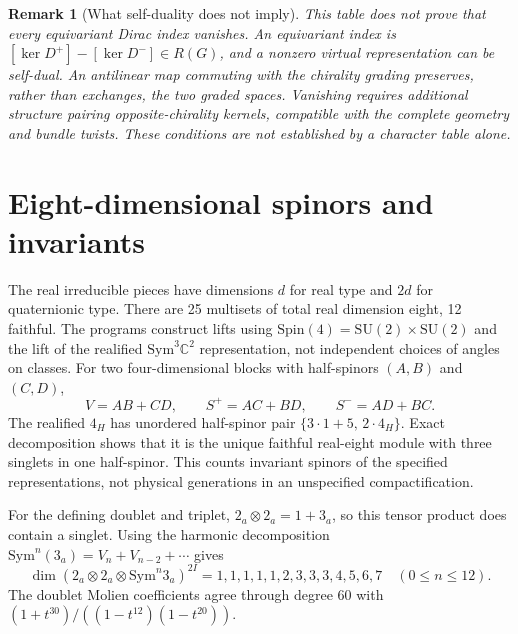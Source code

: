 \documentclass[11pt,a4paper]{amsart}
\newtheorem{remark}[proposition]{Remark}
\newcommand{\C}{\mathbb C}
\newcommand{\SU}{\mathrm{SU}}
\newcommand{\Spin}{\mathrm{Spin}}
\newcommand{\Sym}{\mathrm{Sym}}
\begin{document}
\begin{remark}[What self-duality does not imply]
This table does not prove that every equivariant Dirac index vanishes.
An equivariant index is $[\ker D^+]-[\ker D^-]\in R(G)$, and a nonzero
virtual representation can be self-dual. An antilinear map commuting with
the chirality grading preserves, rather than exchanges, the two graded
spaces. Vanishing requires additional structure pairing opposite-chirality
kernels, compatible with the complete geometry and bundle twists. These
conditions are not established by a character table alone.
\end{remark}

\section{Eight-dimensional spinors and invariants}
The real irreducible pieces have dimensions $d$ for real type and $2d$
for quaternionic type. There are 25 multisets of total real dimension eight,
12 faithful. The programs construct lifts using
$\Spin(4)=\SU(2)\times\SU(2)$ and the lift of the realified
$\Sym^3\C^2$ representation, not independent choices of angles on classes.
For two four-dimensional blocks with half-spinors $(A,B)$ and $(C,D)$,
\[
 V=AB+CD,\qquad S^+=AC+BD,\qquad S^-=AD+BC.
\]
The realified $4_H$ has unordered half-spinor pair
$\{3\cdot1+5,\,2\cdot4_H\}$. Exact decomposition shows that it is the
unique faithful real-eight module with three singlets in one half-spinor.
This counts invariant spinors of the specified representations, not
physical generations in an unspecified compactification.

For the defining doublet and triplet,
$2_a\otimes2_a=1+3_a$, so this tensor product does contain a singlet.
Using the harmonic decomposition
$\Sym^n(3_a)=V_n+V_{n-2}+\cdots$ gives
\[
\dim(2_a\otimes2_a\otimes\Sym^n3_a)^{2I}
=1,1,1,1,1,2,3,3,3,4,5,6,7
\quad(0\leq n\leq12).
\]
The doublet Molien coefficients agree through degree 60 with
$(1+t^{30})/((1-t^{12})(1-t^{20}))$.
\end{document}
